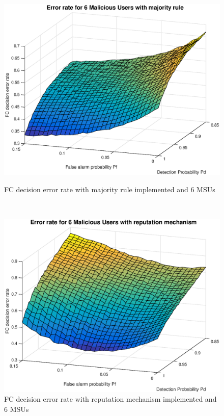 \documentclass[letterpaper, 10 pt, conference]{ieeeconf}  %
\begin{document}
    \begin{figure}[t]

    \begin{minipage}[t]{0.5\textwidth}
        \centering
        \includegraphics[width=\linewidth]{figures/mr6mu.eps}
        \caption{FC decision error rate with majority rule implemented and 6 MSUs}
        \label{mr6}
    \end{minipage}
    ~ 
    \begin{minipage}[t]{0.5\textwidth}
        \centering
        \includegraphics[width=\linewidth]{figures/rm6mu.eps}
        \caption{FC decision error rate with reputation mechanism implemented and 6 MSUs}
        \label{rm6}
    \end{minipage}
\end{figure}
\end{document}
